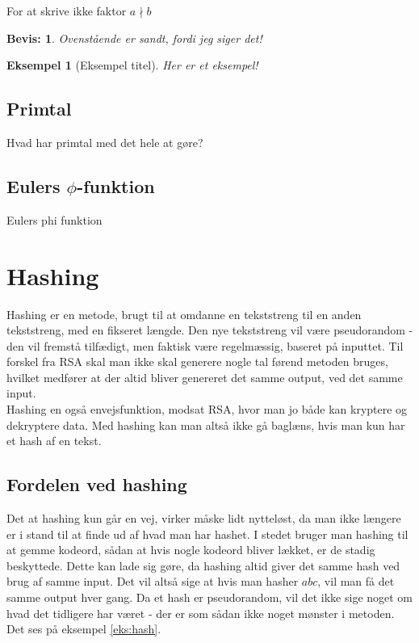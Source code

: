 \documentclass[a4paper, 12pt]{article}
\theoremstyle{break}
\newtheorem{eks}[definition]{Eksempel} %
\theoremstyle{breakline}
\theoremstyle{beviser}
\newtheorem*{bevis}{Bevis:} %
\begin{document}
    \begin{definition}
        For at skrive ikke faktor \(a \nmid b\)
    \end{definition}


    \begin{bevis}
        Ovenstående er sandt, fordi jeg siger det!
    \end{bevis}

    \begin{eks}[Eksempel titel]
        Her er et eksempel!


    \end{eks}




    \subsection{Primtal}
    Hvad har primtal med det hele at gøre?

    \subsection{Eulers \texorpdfstring{\(\phi\)}{Lg}-funktion}
    Eulers phi funktion


\newpage
\section{Hashing}
Hashing er en metode, brugt til at omdanne en tekststreng til en anden tekststreng, med en fikseret længde.
Den nye tekststreng vil være pseudorandom - den vil fremstå tilfædigt, men faktisk være regelmæssig, baseret på inputtet.
Til forskel fra RSA skal man ikke skal generere nogle tal førend metoden bruges, hvilket medfører at der altid bliver genereret det samme output, ved det samme input.
\\
Hashing en også envejsfunktion, modsat RSA, hvor man jo både kan kryptere og dekryptere data.
Med hashing kan man altså ikke gå baglæns, hvis man kun har et hash af en tekst.


    \subsection{Fordelen ved hashing}
    Det at hashing kun går en vej, virker måske lidt nytteløst, da man ikke længere er i stand til at finde ud af hvad man har hashet.
    I stedet bruger man hashing til at gemme kodeord, sådan at hvis nogle kodeord bliver lækket, er de stadig beskyttede.
    Dette kan lade sig gøre, da hashing altid giver det samme hash ved brug af samme input.
    Det vil altså sige at hvis man hasher \(abc\), vil man få det samme output hver gang.
    Da et hash er pseudorandom, vil det ikke sige noget om hvad det tidligere har været - der er som sådan ikke noget mønster i metoden.
    Det ses på eksempel \autoref{eks:hash}.
\end{document}
